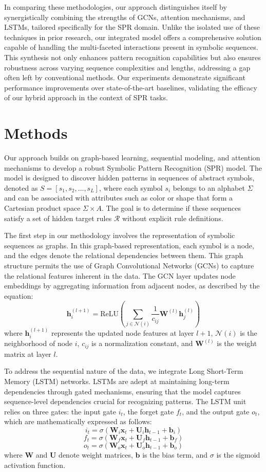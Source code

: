 \documentclass{article}
\begin{document}
In comparing these methodologies, our approach distinguishes itself by synergistically combining the strengths of GCNs, attention mechanisms, and LSTMs, tailored specifically for the SPR domain. Unlike the isolated use of these techniques in prior research, our integrated model offers a comprehensive solution capable of handling the multi-faceted interactions present in symbolic sequences. This synthesis not only enhances pattern recognition capabilities but also ensures robustness across varying sequence complexities and lengths, addressing a gap often left by conventional methods. Our experiments demonstrate significant performance improvements over state-of-the-art baselines, validating the efficacy of our hybrid approach in the context of SPR tasks.

\section{Methods}
Our approach builds on graph-based learning, sequential modeling, and attention mechanisms to develop a robust Symbolic Pattern Recognition (SPR) model. The model is designed to discover hidden patterns in sequences of abstract symbols, denoted as $S = [s_1, s_2, \ldots, s_L]$, where each symbol $s_i$ belongs to an alphabet $\Sigma$ and can be associated with attributes such as color or shape that form a Cartesian product space $\Sigma \times A$. The goal is to determine if these sequences satisfy a set of hidden target rules $\mathcal{R}$ without explicit rule definitions.

The first step in our methodology involves the representation of symbolic sequences as graphs. In this graph-based representation, each symbol is a node, and the edges denote the relational dependencies between them. This graph structure permits the use of Graph Convolutional Networks (GCNs) to capture the relational features inherent in the data. The GCN layer updates node embeddings by aggregating information from adjacent nodes, as described by the equation:
\[
\mathbf{h}_i^{(l+1)} = \text{ReLU}\left(\sum_{j \in \mathcal{N}(i)} \frac{1}{c_{ij}} \mathbf{W}^{(l)} \mathbf{h}_j^{(l)}\right)
\]
where $\mathbf{h}_i^{(l+1)}$ represents the updated node features at layer $l+1$, $\mathcal{N}(i)$ is the neighborhood of node $i$, $c_{ij}$ is a normalization constant, and $\mathbf{W}^{(l)}$ is the weight matrix at layer $l$.

To address the sequential nature of the data, we integrate Long Short-Term Memory (LSTM) networks. LSTMs are adept at maintaining long-term dependencies through gated mechanisms, ensuring that the model captures sequence-level dependencies crucial for recognizing patterns. The LSTM unit relies on three gates: the input gate $i_t$, the forget gate $f_t$, and the output gate $o_t$, which are mathematically expressed as follows:
\[
i_t = \sigma(\mathbf{W}_i \mathbf{x}_t + \mathbf{U}_i \mathbf{h}_{t-1} + \mathbf{b}_i)
\]
\[
f_t = \sigma(\mathbf{W}_f \mathbf{x}_t + \mathbf{U}_f \mathbf{h}_{t-1} + \mathbf{b}_f)
\]
\[
o_t = \sigma(\mathbf{W}_o \mathbf{x}_t + \mathbf{U}_o \mathbf{h}_{t-1} + \mathbf{b}_o)
\]
where $\mathbf{W}$ and $\mathbf{U}$ denote weight matrices, $\mathbf{b}$ is the bias term, and $\sigma$ is the sigmoid activation function.
\end{document}
